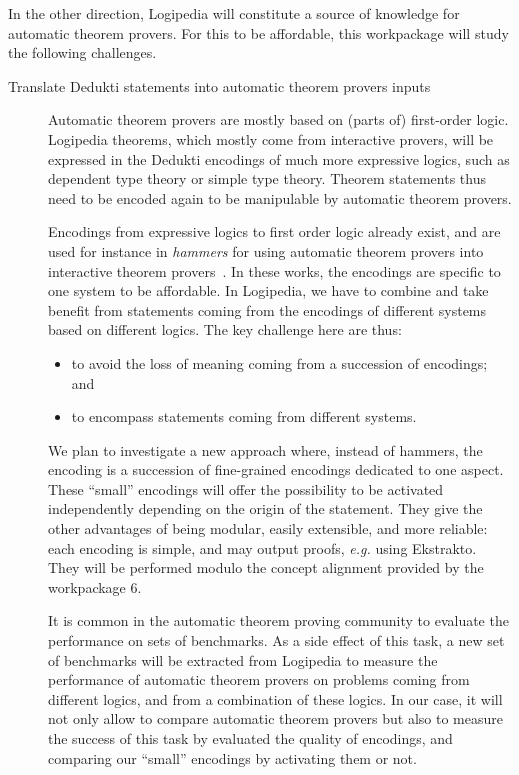 In the other direction, Logipedia will constitute a source of
knowledge for automatic theorem provers. For this to be affordable, this workpackage will
study the following challenges.

\begin{description}
\item[Translate Dedukti statements into automatic theorem provers
  inputs] Automatic theorem provers are mostly based on (parts of)
  first-order logic.  Logipedia theorems, which mostly come from
  interactive provers, will be expressed in the Dedukti encodings of
  much more expressive logics, such as dependent type theory or simple
  type theory.  Theorem statements thus need to be encoded again to be
  manipulable by automatic theorem provers.

  Encodings from expressive logics to first order logic already exist,
  and are used for instance in {\em hammers} for using automatic theorem provers into
  interactive theorem
  provers~\cite{DBLP:conf/lpar/PaulsonB10,DBLP:journals/jar/CzajkaK18}.
  In these works, the encodings are specific to one system to be
  affordable. In Logipedia, we have to combine and take benefit
  from statements coming from the encodings of different systems based
  on different logics. The key challenge here are thus:
  \begin{itemize}
  \item to avoid the loss of meaning coming from a succession of
    encodings; and
  \item to encompass statements coming from different systems.
  \end{itemize}
  We plan to investigate a new approach where, instead of hammers, the
  encoding is a succession of fine-grained encodings dedicated to one
  aspect. These ``small'' encodings will offer the possibility to be
  activated independently depending on the origin of the statement. They
  give the other advantages of being modular, easily extensible, and
  more reliable: each encoding is simple, and may output proofs, {\em
    e.g.} using Ekstrakto. They will be performed modulo the concept
  alignment provided by the workpackage 6.

  It is common in the automatic theorem proving community to evaluate the performance on
  sets of benchmarks. As a side effect of this task, a new set of
  benchmarks will be extracted from Logipedia to measure the
  performance of automatic theorem provers on problems coming from different logics, and from
  a combination of these logics. In our case, it will not only allow to
  compare automatic theorem provers but also to measure the success of this task by evaluated
  the quality of encodings, and comparing our ``small'' encodings by
  activating them or not.


\end{description}
